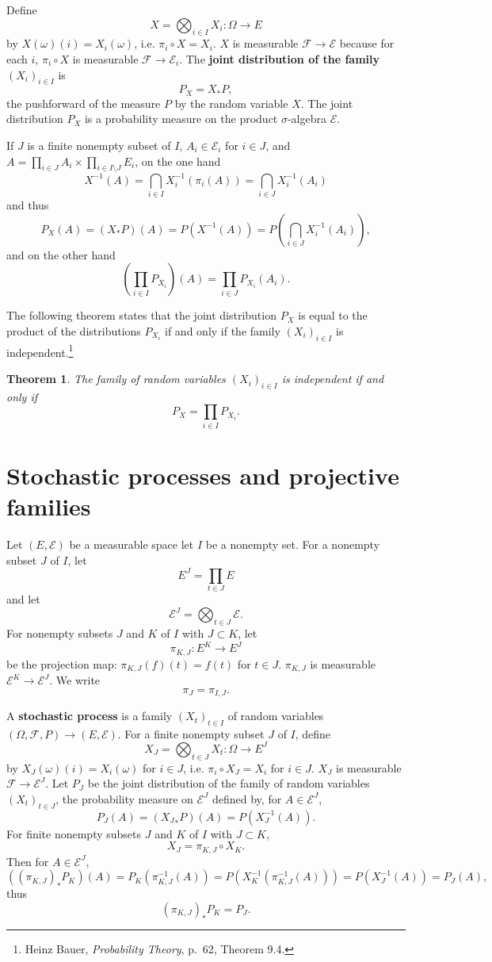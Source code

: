 \documentclass{article}
\newtheorem{theorem}{Theorem}
\theoremstyle{definition}
\begin{document}
Define
\[
X=\bigotimes_{i \in I} X_i:\Omega \to E
\]
by
$X(\omega)(i) = X_i(\omega)$,
i.e.  $\pi_i \circ X = X_i$.
$X$ is measurable $\mathscr{F} \to \mathscr{E}$ because for each $i$,
$\pi_i \circ X$ is measurable
$\mathscr{F} \to \mathscr{E}_i$.
The \textbf{joint distribution of the family $(X_i)_{i \in I}$} is
\[
P_X = X_*P,
\]
the pushforward of the measure $P$ by the random variable $X$. The joint distribution
$P_X$ is a probability measure on the product $\sigma$-algebra $\mathscr{E}$. 


If $J$ is a finite nonempty subset of $I$, $A_i \in \mathscr{E}_i$ for $i \in J$, and
$A = \prod_{i \in J} A_i \times \prod_{i \in I \setminus J} E_i$, 
on the one hand
\[
X^{-1}(A) = \bigcap_{i \in I} X_i^{-1}(\pi_i(A)) =\bigcap_{i \in J} X_i^{-1}(A_i)
\]
and thus
\[
P_X(A) = (X_*P)(A) = P(X^{-1}(A)) = P\left(\bigcap_{i \in J} X_i^{-1}(A_i) \right),
\]
and on the other hand
\[
\left(\prod_{i \in I} P_{X_i} \right)(A) = \prod_{i \in J} P_{X_i}(A_i).
\]


The following theorem states that the
joint distribution $P_X$ is equal to the product of the distributions $P_{X_i}$
if and only if the family
$(X_i)_{i \in I}$ is independent.\footnote{Heinz
Bauer, {\em Probability Theory}, p.~62, Theorem 9.4.}

\begin{theorem}
The family of random variables $(X_i)_{i \in I}$ is independent if and only if
\[
P_X = \prod_{i \in I} P_{X_i}.
\]
\end{theorem}



\section{Stochastic processes and projective families}
Let   $(E,\mathscr{E})$ be a measurable space let $I$ be a nonempty set. For a nonempty subset $J$ of $I$, 
let
\[
E^J = \prod_{t \in J} E
\]
and let
\[
\mathscr{E}^J = \bigotimes_{t \in J} \mathscr{E}.
\]
For nonempty subsets $J$ and $K$ of $I$ with $J \subset K$, let
\[
\pi_{K,J}:E^K \to E^J
\]
be the projection map: $\pi_{K,J}(f)(t)=f(t)$ for $t \in J$. 
$\pi_{K,J}$ is measurable  $\mathscr{E}^K \to \mathscr{E}^J$. 
We write
\[
\pi_J = \pi_{I,J}. 
\]

A \textbf{stochastic process} is a family $(X_t)_{t \in I}$
 of random variables
 $(\Omega,\mathscr{F},P) \to (E,\mathscr{E})$. 
 For a finite nonempty subset $J$ of $I$, define
 \[
 X_J = \bigotimes_{t \in J} X_t:\Omega \to E^J
 \]
by $X_J(\omega)(i)=X_i(\omega)$ for $i \in J$, i.e.
$\pi_i \circ X_J = X_i$ for $i \in J$.
$X_J$ is measurable $\mathscr{F} \to \mathscr{E}^J$. 
Let $P_J$ be the joint distribution of the family of
random variables $(X_t)_{t \in J}$, the probability measure on
$\mathscr{E}^J$ defined by, for $A \in \mathscr{E}^J$,
\[
P_J(A) = ({X_J}_*P)(A) = P(X_J^{-1}(A)).
\]
For finite nonempty subsets $J$ and $K$ of $I$ with $J \subset K$,
\[
X_J = \pi_{K,J} \circ X_K.
\]
Then for $A \in \mathscr{E}^J$,
\[
((\pi_{K,J})_*P_K)(A)=
P_K(\pi_{K,J}^{-1}(A))
=P(X_K^{-1}(\pi_{K,J}^{-1}(A)))
=P(X_J^{-1}(A))
=P_J(A),
\]
thus
\begin{equation}
(\pi_{K,J})_*P_K = P_J.
\label{projective}
\end{equation}
\end{document}
